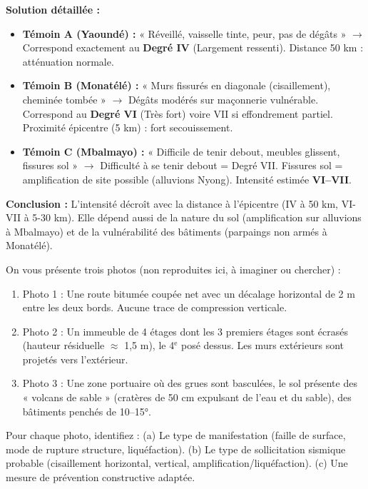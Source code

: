 \documentclass[11pt]{article}
\begin{document}
\begin{exoresolu}
\tcblower
\textbf{Solution détaillée :}
\begin{itemize}
    \item \textbf{Témoin A (Yaoundé) :} « Réveillé, vaisselle tinte, peur, pas de dégâts » $\rightarrow$ Correspond exactement au \textbf{Degré IV} (Largement ressenti). Distance 50 km : atténuation normale.
    \item \textbf{Témoin B (Monatélé) :} « Murs fissurés en diagonale (cisaillement), cheminée tombée » $\rightarrow$ Dégâts modérés sur maçonnerie vulnérable. Correspond au \textbf{Degré VI} (Très fort) voire VII si effondrement partiel. Proximité épicentre (5 km) : fort secouissement.
    \item \textbf{Témoin C (Mbalmayo) :} « Difficile de tenir debout, meubles glissent, fissures sol » $\rightarrow$ Difficulté à se tenir debout = Degré VII. Fissures sol = amplification de site possible (alluvions Nyong). Intensité estimée \textbf{VI--VII}.
\end{itemize}
\textbf{Conclusion :} L'intensité décroît avec la distance à l'épicentre (IV à 50 km, VI-VII à 5-30 km). Elle dépend aussi de la nature du sol (amplification sur alluvions à Mbalmayo) et de la vulnérabilité des bâtiments (parpaings non armés à Monatélé).
\end{exoresolu}

\begin{exercice}
On vous présente trois photos (non reproduites ici, à imaginer ou chercher) :
\begin{enumerate}
    \item Photo 1 : Une route bitumée coupée net avec un décalage horizontal de 2 m entre les deux bords. Aucune trace de compression verticale.
    \item Photo 2 : Un immeuble de 4 étages dont les 3 premiers étages sont écrasés (hauteur résiduelle $\approx$ 1,5 m), le 4$^{\text{e}}$ posé dessus. Les murs extérieurs sont projetés vers l'extérieur.
    \item Photo 3 : Une zone portuaire où des grues sont basculées, le sol présente des « volcans de sable » (cratères de 50 cm expulsant de l'eau et du sable), des bâtiments penchés de 10--15°.
\end{enumerate}
Pour chaque photo, identifiez : (a) Le type de manifestation (faille de surface, mode de rupture structure, liquéfaction). (b) Le type de sollicitation sismique probable (cisaillement horizontal, vertical, amplification/liquéfaction). (c) Une mesure de prévention constructive adaptée.
\end{exercice}
\end{document}
